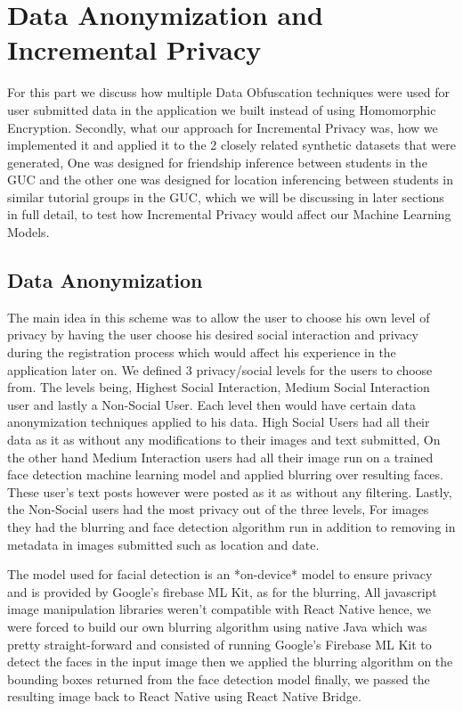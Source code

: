 \section{Data Anonymization and Incremental Privacy}
\label{Part:PrivacyLev}
For this part we discuss how multiple Data Obfuscation techniques were used for user submitted data in the application we built instead of using Homomorphic Encryption.
Secondly, what our approach for Incremental Privacy was, how we implemented it and applied it to the 2 closely related synthetic datasets that were generated, One was designed for friendship inference between students in the GUC and the other one was designed for location inferencing between
students in similar tutorial groups in the GUC, which we will be discussing in later sections in full detail, to test how Incremental Privacy would affect our Machine Learning Models.
\subsection{Data Anonymization}
The main idea in this scheme was to allow the user to choose his own level of privacy by having the user choose his desired social interaction and privacy during the registration process which would affect his experience in the application later on. We defined 3 privacy/social levels for the users to choose from. The levels being, Highest Social Interaction, Medium Social Interaction user and lastly a Non-Social User. Each level then would have certain data anonymization techniques applied to his data.
High Social Users had all their data as it as without any modifications to their images and text submitted, On the other hand Medium Interaction users had all their image run on a trained face detection machine learning model and applied blurring over resulting faces. These user’s text posts however were posted as it as without any filtering.
Lastly, the Non-Social users had the most privacy out of the three levels, For images they had the blurring and face detection algorithm run in addition to removing in metadata in images submitted such as location and date.\par

The model used for facial detection is an *on-device* model to ensure privacy and is provided by Google’s firebase ML Kit, as for the blurring, All javascript image manipulation libraries weren't compatible with React Native hence, we were forced
to build our own blurring algorithm using native Java which was pretty straight-forward and consisted of running Google's Firebase ML Kit to detect the faces in the input image then we applied the blurring algorithm on the bounding boxes returned from the face detection model finally, we passed the resulting image back to React Native using React Native Bridge.\par


